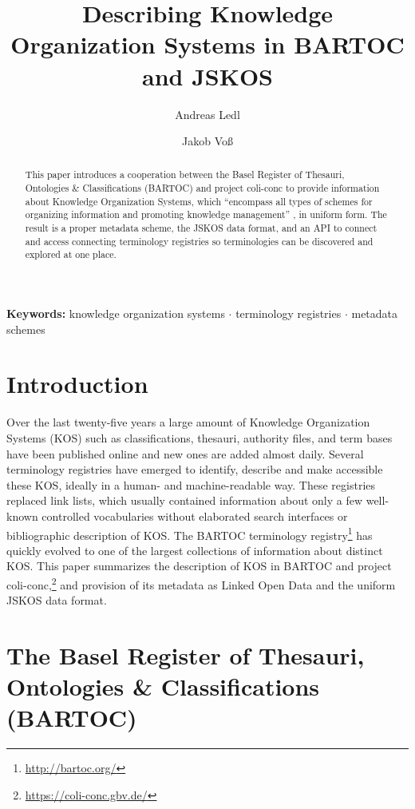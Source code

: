 \documentclass[12pt,a4paper]{llncs}
\title{Describing Knowledge Organization Systems in BARTOC and JSKOS}
\author{Andreas Ledl\inst{1}  \and Jakob Voß\inst{2}}
\institute{University Library of Basel, Basel
\and Verbundzentrale des GBV (VZG), Göttingen}
\begin{document}
\maketitle
\begin{abstract}
This paper introduces a cooperation between the Basel Register of Thesauri, Ontologies \& Classifications (BARTOC) and project coli-conc to provide information about Knowledge Organization Systems, which ``encompass all types of schemes for organizing information and promoting knowledge management'' \cite{hodge2000systems}, in uniform form. The result is a proper metadata scheme, the JSKOS data format, and an API to connect and access connecting terminology registries so terminologies can be discovered and explored at one place. 
\end{abstract}
\begin{adjustwidth}{2.5em}{2.5em}
\small {\bf Keywords:} knowledge organization systems $\cdot$ terminology registries $\cdot$ metadata schemes
\end{adjustwidth}

\section{Introduction}

Over the last twenty-five years a large amount of Knowledge Organization Systems (KOS)
such as classifications, thesauri, authority files, and term bases have been published online and new ones are added almost daily. Several terminology registries have emerged to identify, describe and make accessible these KOS, ideally in a human- and machine-readable way. These registries replaced link lists, which usually contained information about only a few well-known controlled vocabularies without  elaborated search interfaces or bibliographic description of KOS. The BARTOC terminology registry\footnote{\href{http://bartoc.org/}{http://bartoc.org/}} has quickly evolved to one of the largest collections of information about distinct KOS. This paper summarizes the description of KOS in BARTOC and project coli-conc,\footnote{\href{https://coli-conc.gbv.de/}{https://coli-conc.gbv.de/}} and provision of its metadata as Linked Open Data and the uniform JSKOS data format.

\section{The Basel Register of Thesauri, Ontologies \& Classifications (BARTOC)\protect}
\end{document}
